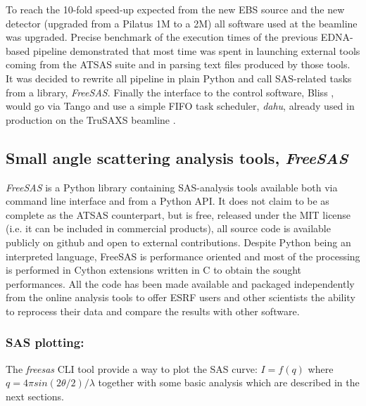 \documentclass[preprint]{iucr}              %
\begin{document}
To reach the 10-fold speed-up expected from the new EBS source and the new detector (upgraded from a Pilatus 1M to a 2M) all software used at the beamline was upgraded.
Precise benchmark of the execution times of the previous EDNA-based pipeline demonstrated that 
most time was spent in launching external tools coming from the ATSAS suite and in parsing text files produced by those tools.
It was decided to rewrite all pipeline in plain Python \cite{python} and call SAS-related tasks from a library, \textit{FreeSAS}. 
Finally the interface to the control software, Bliss \cite{bliss}, would go via Tango \cite{tango} and use a simple FIFO task scheduler,  \textit{dahu}, already used in production on the TruSAXS beamline \cite{id02_2022}.   

\subsection{Small angle scattering analysis tools, \textit{FreeSAS}}

\textit{FreeSAS} is a Python \cite{python} library containing SAS-analysis tools available both via command line interface and from a Python API. 
It does not claim to be as complete as the ATSAS counterpart,
but is free, released under the MIT license (i.e. it can be included in commercial products), all source code is available publicly on github \cite{freesas} and
open to external contributions.
Despite Python being an interpreted language, FreeSAS is performance oriented and most of the processing is performed in Cython \cite{cython} extensions written in C to obtain the sought performances. 
All the code has been made available and packaged independently from the online analysis tools to offer ESRF users and other scientists the ability to reprocess their data and compare the results with other software.

\subsubsection{SAS plotting:} The \textit{freesas} CLI tool provide a way to plot the SAS curve: $I=f(q)$ where $q = 4\pi sin(2\theta/2)/\lambda$ together with some basic analysis which are described in the next sections.
\end{document}
